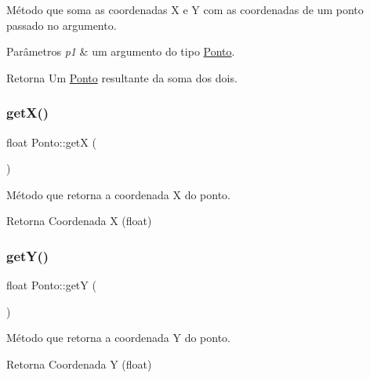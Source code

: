 Método que soma as coordenadas X e Y com as coordenadas de um ponto passado no argumento. 


\begin{DoxyParams}{Parâmetros}
{\em p1} & um argumento do tipo \mbox{\hyperlink{classPonto}{Ponto}}. \\
\hline
\end{DoxyParams}
\begin{DoxyReturn}{Retorna}
Um \mbox{\hyperlink{classPonto}{Ponto}} resultante da soma dos dois. 
\end{DoxyReturn}
\mbox{\label{classPonto_ae4823d6ee26ff3448ee403d26a3c6d2f}} 
\subsubsection{\texorpdfstring{get\+X()}{getX()}}
{\footnotesize\ttfamily float Ponto\+::getX (\begin{DoxyParamCaption}{ }\end{DoxyParamCaption})\hspace{0.3cm}{\ttfamily [inline]}}



Método que retorna a coordenada X do ponto. 

\begin{DoxyReturn}{Retorna}
Coordenada X (float) 
\end{DoxyReturn}
\mbox{\label{classPonto_ab120600953e6544301223b9b05a43ee5}} 
\subsubsection{\texorpdfstring{get\+Y()}{getY()}}
{\footnotesize\ttfamily float Ponto\+::getY (\begin{DoxyParamCaption}{ }\end{DoxyParamCaption})\hspace{0.3cm}{\ttfamily [inline]}}



Método que retorna a coordenada Y do ponto. 

\begin{DoxyReturn}{Retorna}
Coordenada Y (float) 
\end{DoxyReturn}
\mbox{\label{classPonto_a9b0ddbdddd05edbc4d45ef0671a628c6}} 
